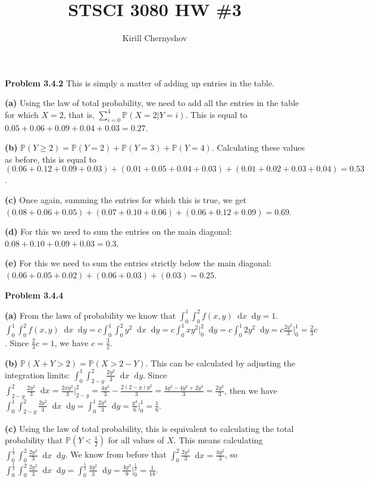 \documentclass[11pt]{amsart}
\newcommand{\name}{Kirill Chernyshov}
\newcommand{\hwnumber}{3}
\newcommand*\diff{\mathop{}\!\mathrm{d}}
\newcommand{\problem}[1]{\bigskip\noindent\textbf{Problem #1}}
\newcommand{\ppart}[1]{\bigskip\textbf{(#1)}}
\begin{document}
\title{STSCI 3080 HW \#\hwnumber}
\author{\name}
\maketitle


\problem{3.4.2}
This is simply a matter of adding up entries in the table.

\ppart{a}
Using the law of total probability, we need to add all the entries in the table for which $X = 2$, that is, $\sum_{i = 0}^4 \mathbb{P}(X = 2 | Y = i)$. This is equal to $0.05 + 0.06 + 0.09 + 0.04 + 0.03 = 0.27$.

\ppart{b}
$\mathbb{P}(Y \geq 2) = \mathbb{P}(Y = 2) + \mathbb{P}(Y = 3) + \mathbb{P}(Y = 4)$. Calculating these values as before, this is equal to $(0.06 + 0.12 + 0.09 + 0.03) + (0.01 + 0.05 + 0.04 + 0.03) + (0.01 + 0.02 + 0.03 + 0.04) = 0.53$.

\ppart{c}
Once again, summing the entries for which this is true, we get $(0.08 + 0.06 + 0.05) + (0.07 + 0.10 + 0.06) + (0.06 + 0.12 + 0.09) = 0.69$.

\ppart{d}
For this we need to sum the entries on the main diagonal: $0.08 + 0.10 + 0.09 + 0.03 = 0.3$.

\ppart{e}
For this we need to sum the entries strictly below the main diagonal: $(0.06 + 0.05 + 0.02) + (0.06 + 0.03) + (0.03) = 0.25$.

\problem{3.4.4}

\ppart{a}
From the laws of probability we know that $\int_0^1 \int_0^2 f(x, y) \diff x \diff y = 1$. $\int_0^1 \int_0^2 f(x, y) \diff x \diff y = c\int_0^1 \int_0^2 y^2 \diff x \diff y = c\int_0^1  xy^2 \Big|_0^2 \diff y = c\int_0^1  2y^2 \diff y = c \frac{2y^3}{3} \Big|_0^1 = \frac{2}{3}c$. Since $\frac{2}{3}c = 1$, we have $c = \frac{3}{2}$.

\ppart{b}
$\mathbb{P}(X + Y > 2) = \mathbb{P}(X > 2 - Y)$. This can be calculated by adjusting the integration limits: $\int_0^1 \int_{2 - y}^2 \frac{2y^2}{3} \diff x \diff y$. Since $\int_{2 - y}^2 \frac{2y^2}{3} \diff x = \frac{2xy^2}{3} \Big|_{2 - y}^2 = \frac{4y^2}{3} - \frac{2(2 - y)y^2}{3} = \frac{4y^2 - 4y^2 + 2y^3}{3} = \frac{2y^3}{3}$, then we have $\int_0^1 \int_{2 - y}^2 \frac{2y^2}{3} \diff x \diff y = \int_0^1 \frac{2y^3}{3} \diff y = \frac{y^4}{6} \Big|_0^1 = \frac{1}{6}$.

\ppart{c}
Using the law of total probability, this is equivalent to calculating the total probability that $\mathbb{P}\left(Y < \frac{1}{2}\right)$ for all values of $X$. This means calculating $\int_0^{\frac{1}{2}} \int_0^2 \frac{2y^2}{3} \diff x \diff y$. We know from before that $\int_0^2 \frac{2y^2}{3} \diff x = \frac{4y^2}{3}$, so $\int_0^{\frac{1}{2}} \int_0^2 \frac{2y^2}{3} \diff x \diff y = \int_0^{\frac{1}{2}} \frac{4y^2}{3} \diff y = \frac{4y^3}{9} \Big|_0^{\frac{1}{2}} = \frac{1}{18}$.
\end{document}

